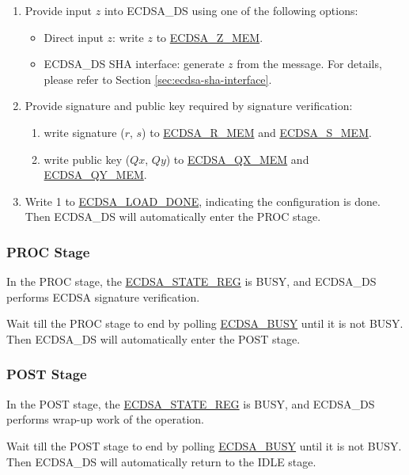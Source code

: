 \documentclass[main\_\_EN.tex]{subfiles}
\begin{document}
\begin{enumerate}
	\item Provide input $z$ into ECDSA\_DS using one of the following options:
	      \begin{itemize}
		      \item Direct input $z$: write $z$ to \hyperref[tab:ecdsa-memory]{ECDSA\_Z\_MEM}.
		      \item ECDSA\_DS SHA interface: generate $z$ from the message. For details, please refer to Section \ref{sec:ecdsa-sha-interface}.
	      \end{itemize}
		      \item Provide signature and public key required by signature verification:
		            \begin{enumerate}
			            \item write signature ($r$, $s$) to \hyperref[tab:ecdsa-memory]{ECDSA\_R\_MEM} and \hyperref[tab:ecdsa-memory]{ECDSA\_S\_MEM}.
			            \item write public key ($Qx$, $Qy$) to \hyperref[tab:ecdsa-memory]{ECDSA\_QX\_MEM} and \hyperref[tab:ecdsa-memory]{ECDSA\_QY\_MEM}.
		            \end{enumerate}
	\item Write 1 to \hyperref[fielddesc:ECDSALOADDONE]{ECDSA\_LOAD\_DONE}, indicating the configuration is done. Then ECDSA\_DS will automatically enter the PROC stage.
\end{enumerate}

\subsubsection{PROC Stage}

In the PROC stage, the \hyperref[regdesc:ECDSASTATEREG]{ECDSA\_STATE\_REG} is BUSY, and ECDSA\_DS performs ECDSA signature verification.

Wait till the PROC stage to end by polling \hyperref[fielddesc:ECDSABUSY]{ECDSA\_BUSY} until it is not BUSY. Then ECDSA\_DS will automatically enter the POST stage.


\subsubsection{POST Stage}

In the POST stage, the \hyperref[regdesc:ECDSASTATEREG]{ECDSA\_STATE\_REG} is BUSY, and ECDSA\_DS performs wrap-up work of the operation.

Wait till the POST stage to end by polling \hyperref[fielddesc:ECDSABUSY]{ECDSA\_BUSY} until it is not BUSY. Then ECDSA\_DS will automatically return to the IDLE stage.
\end{document}
